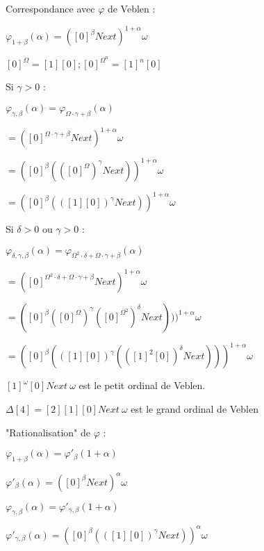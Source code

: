 \documentclass[12pt]{beamer}
\begin{document}
\begin{frame}

Correspondance avec \(\varphi\) de Veblen :

\small

\medskip

\( \varphi_{1+\beta}(\alpha) = ([0]^\beta Next)^{1+\alpha} \omega \)

\( [0]^\Omega = [1] [0] ; [0]^{\Omega^n} = [1]^n [0] \)

\medskip

Si \( \gamma > 0 \) :

\( \varphi_{\gamma,\beta}(\alpha) = \varphi_{\Omega\cdot\gamma+\beta}(\alpha) \)

\( = ([0]^{\Omega\cdot\gamma+\beta} Next)^{1+\alpha} \omega \)

\( = ([0]^\beta (([0]^\Omega)^\gamma Next))^{1+\alpha} \omega \)

\( = ([0]^\beta (([1] [0])^\gamma Next))^{1+\alpha} \omega \)

\medskip

Si \( \delta > 0 \) ou \( \gamma > 0 \) :

\( \varphi_{\delta,\gamma,\beta}(\alpha) = \varphi_{\Omega^2\cdot\delta+\Omega\cdot\gamma+\beta}(\alpha) \)

\(  = ([0]^{\Omega^2\cdot\delta+\Omega\cdot\gamma+\beta} Next)^{1+\alpha} \omega \)

\( = ([0]^\beta ([0]^\Omega)^\gamma ([0]^{\Omega^2})^\delta Next)))^{1+\alpha} \omega \)

\( = ([0]^\beta (([1] [0])^\gamma (([1]^2 [0])^\delta Next)))^{1+\alpha} \omega \) 

\medskip

\( [1]^\omega [0] Next\ \omega \) est le petit ordinal de Veblen.

\( \Delta[4] = [2] [1] [0] Next\ \omega \) est le grand ordinal de Veblen

\end{frame}
\begin{frame}

"Rationalisation" de \( \varphi \) : 

\medskip

\(\varphi_{1+\beta}(\alpha) = \varphi'_\beta(1+\alpha) \)

\( \varphi'_\beta(\alpha) = ([0]^\beta Next)^\alpha \omega \)

\medskip

\( \varphi_{\gamma,\beta}(\alpha) = \varphi'_{\gamma,\beta}(1+\alpha) \) 

\( \varphi'_{\gamma,\beta}(\alpha) = ([0]^\beta (([1] [0])^\gamma Next))^{\alpha} \omega \)


\end{frame}
\end{document}
